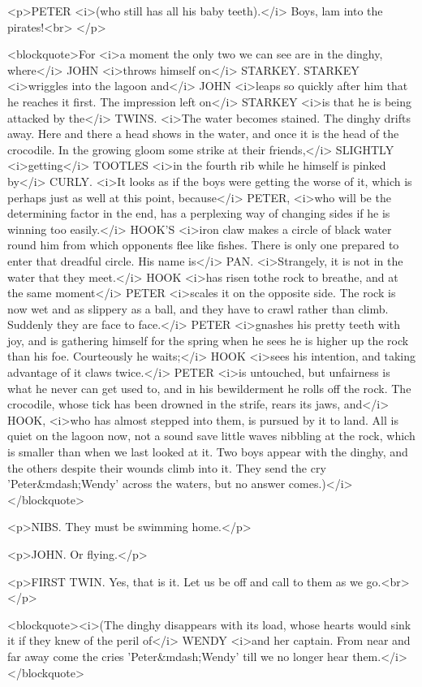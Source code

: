 <p>PETER <i>(who still has all his baby teeth).</i> Boys, lam into
the pirates!<br>
</p>

<blockquote>For <i>a moment the only two we can see are in the
dinghy, where</i> JOHN <i>throws himself on</i> STARKEY. STARKEY
<i>wriggles into the lagoon and</i> JOHN <i>leaps so quickly after
him that he reaches it first. The impression left on</i> STARKEY
<i>is that he is being attacked by the</i> TWINS. <i>The water
becomes stained. The dinghy drifts away. Here and there a head shows
in the water, and once it is the head of the crocodile. In the
growing gloom some strike at their friends,</i> SLIGHTLY
<i>getting</i> TOOTLES <i>in the fourth rib while he himself is
pinked by</i> CURLY. <i>It looks as if the boys were getting the
worse of it, which is perhaps just as well at this point, because</i>
PETER, <i>who will be the determining factor in the end, has a
perplexing way of changing sides if he is winning too easily.</i>
HOOK'S <i>iron claw makes a circle of black water round him from
which opponents flee like fishes. There is only one prepared to enter
that dreadful circle. His name is</i> PAN. <i>Strangely, it is not in
the water that they meet.</i> HOOK <i>has risen tothe rock to
breathe, and at the same moment</i> PETER <i>scales it on the
opposite side. The rock is now wet and as slippery as a ball, and
they have to crawl rather than climb. Suddenly they are face to
face.</i> PETER <i>gnashes his pretty teeth with joy, and is
gathering himself for the spring when he sees he is higher up the
rock than his foe. Courteously he waits;</i> HOOK <i>sees his
intention, and taking advantage of it claws twice.</i> PETER <i>is
untouched, but unfairness is what he never can get used to, and in
his bewilderment he rolls off the rock. The crocodile, whose tick has
been drowned in the strife, rears its jaws, and</i> HOOK, <i>who has
almost stepped into them, is pursued by it to land. All is quiet on
the lagoon now, not a sound save little waves nibbling at the rock,
which is smaller than when we last looked at it. Two boys appear with
the dinghy, and the others despite their wounds climb into it. They
send the cry 'Peter&mdash;Wendy' across the waters, but no answer
comes.)</i></blockquote>

<p>NIBS. They must be swimming home.</p>

<p>JOHN. Or flying.</p>

<p>FIRST TWIN. Yes, that is it. Let us be off and call to them as we
go.<br>
</p>

<blockquote><i>(The dinghy disappears with its load, whose hearts
would sink it if they knew of the peril of</i> WENDY <i>and her
captain. From near and far away come the cries 'Peter&mdash;Wendy'
till we no longer hear them.</i></blockquote>

